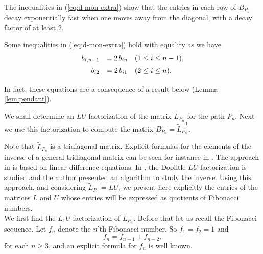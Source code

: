 \documentclass[12pt]{article}
\begin{document}
The inequalities in (\ref{eq:d-mon-extra}) show that the entries in each row of $B_{P_n}$ decay exponentially fast when one moves away from the diagonal, with a decay factor of at least $2$.

Some inequalities in (\ref{eq:d-mon-extra}) hold with equality as we have 
\[
\begin{array}{rcl} \vspace{0.2cm}
   b_{i,n-1}&=2\,b_{in}   &(1\le i \le n-1), \\  \vspace{0.2cm}
   b_{i2}&=2\,b_{i1}   &(2\le i \le n). 
\end{array}
\]   
In fact, these equations are a consequence of a result below (Lemma \ref{lem:pendant}).


We shall determine an $LU$ factorization of the matrix $\tilde{L}_{P_n}$ for the path $P_n$. Next we use this factorization to compute the matrix $B_{P_n}=\tilde{L}_{P_n}^{-1}$.


Note that $\tilde{L}_{P_n}$ is a tridiagonal matrix. Explicit formulas for the elements of the inverse of a general tridiagonal matrix can be seen for instance in \cite{Fonseca, Lewis, Mallik}. The approach in \cite{Mallik} is based on linear difference equations.  In \cite{Mikkawy}, the Doolitle $ LU$ factorization is studied and the author presented an algorithm to study the inverse. Using this approach, and considering $\tilde{L}_{P_n} = L U$, we present here explicitly the entries of the matrices $L$ and $U$ whose entries will be expressed as quotients of Fibonacci numbers. \\


We first find the $L_1U$ factorization of $\tilde{L}_{P_n}.$ Before that let us recall the Fibonacci sequence. 
Let $f_n$ denote the $n$'th Fibonacci number. So $f_1=f_2=1$ and 
\begin{equation} \label{Fibonacci}
f_n=f_{n-1}+f_{n-2},
\end{equation}
for each $n\ge 3$, and an explicit formula for $f_n$ is well known. 

%
\end{document}
